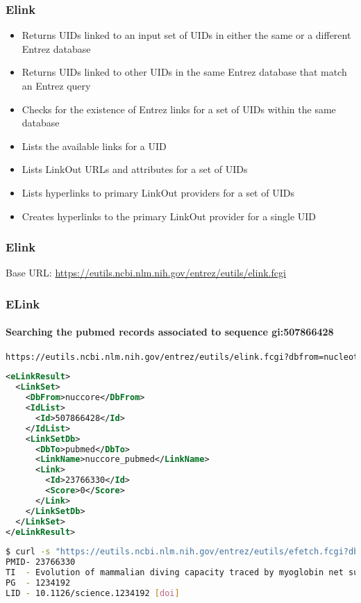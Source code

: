 \documentclass{beamer}
\begin{document}
\begin{frame}[fragile]
\frametitle{Elink}
\begin{itemize}
\item Returns UIDs linked to an input set of UIDs in either the same or a different Entrez database
\item Returns UIDs linked to other UIDs in the same Entrez database that match an Entrez query
\item Checks for the existence of Entrez links for a set of UIDs within the same database
\item Lists the available links for a UID
\item Lists LinkOut URLs and attributes for a set of UIDs
\item Lists hyperlinks to primary LinkOut providers for a set of UIDs
\item Creates hyperlinks to the primary LinkOut provider for a single UID
\end{itemize}
\end{frame}

\begin{frame}[fragile]
\frametitle{Elink}
Base URL:
\small
\url{https://eutils.ncbi.nlm.nih.gov/entrez/eutils/elink.fcgi}
\end{frame}


\begin{frame}[fragile]
\frametitle{ELink}
\framesubtitle{Searching the pubmed records associated to sequence gi:507866428}
\begin{lstlisting}[language=bash,basicstyle=\tiny,breaklines=true,escapechar=\!]
https://eutils.ncbi.nlm.nih.gov/entrez/eutils/elink.fcgi?dbfrom=nucleotide&db=pubmed&id=507866428&cmd=neighbor_score
\end{lstlisting}

\begin{lstlisting}[language=xml,basicstyle=\tiny,breaklines=true,escapechar=\%]
<eLinkResult>
  <LinkSet>
    <DbFrom>nuccore</DbFrom>
    <IdList>
      <Id>507866428</Id>
    </IdList>
    <LinkSetDb>
      <DbTo>pubmed</DbTo>
      <LinkName>nuccore_pubmed</LinkName>
      <Link>
        <Id>23766330</Id>
        <Score>0</Score>
      </Link>
    </LinkSetDb>
  </LinkSet>
</eLinkResult>

\end{lstlisting}

\begin{lstlisting}[language=bash,basicstyle=\tiny,breaklines=true,escapechar=\!]
$ curl -s "https://eutils.ncbi.nlm.nih.gov/entrez/eutils/efetch.fcgi?db=pubmed&id=23766330&rettype=medline&retmode=text"
PMID- 23766330
TI  - Evolution of mammalian diving capacity traced by myoglobin net surface charge.
PG  - 1234192
LID - 10.1126/science.1234192 [doi]
\end{lstlisting}
\end{frame}
\end{document}
